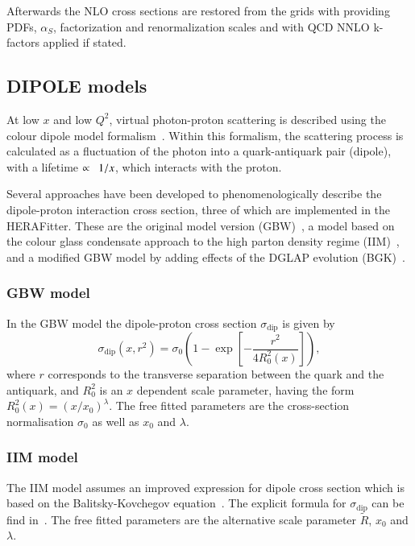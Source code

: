 \documentclass[11pt,a4paper]{article}
\begin{document}
Afterwards the NLO cross sections are restored from the grids
with providing PDFs, \(\alpha_S\), factorization and 
renormalization scales and with QCD NNLO k-factors applied
if stated.

\subsection{DIPOLE models}

At low $x$ and low $Q^{2}$, virtual photon-proton scattering is described using the colour
dipole model formalism~\cite{NNZ:91}. Within this formalism, the scattering process is calculated as a fluctuation of the
photon into a quark-antiquark pair (dipole), with a lifetime $\propto\enskip 1/x$, which interacts with the proton.

Several approaches have been developed to phenomenologically describe the dipole-proton interaction
cross section, three of which are implemented in the HERAFitter. These are
the original model version (GBW)~\cite{Golec-Biernat:1998js}, a model based on the colour glass condensate approach
to the high parton density regime (IIM)~\cite{Iancu:2003ge}, and a modified GBW model by adding effects of the 
DGLAP evolution (BGK)~\cite{Bartels:2002cj}.
\subsubsection{GBW model}
In the GBW model the dipole-proton cross section $\sigma_{\text{dip}}$ is given by
\begin{equation}
\label{eGBW}
   \sigma_{\text{dip}}(x,r^{2}) = \sigma_{0} \left(1 - \exp \left[-\frac{r^{2}}{4R_{0}^{2}(x)} \right]\right),
\end{equation}
where $r$ corresponds to the transverse separation between the quark and the antiquark, and $R_{0}^{2}$ is 
an $x$ dependent scale parameter, having the form $R_{0}^{2}(x)=\left(x/x_{0}\right)^{\lambda}$.
The free fitted parameters are the cross-section normalisation $\sigma_{0}$ as well as $x_{0}$ and $\lambda$.
\subsubsection{IIM model}
The IIM model assumes an improved expression for dipole cross section which is based on the 
Balitsky-Kovchegov equation~\cite{Balitsky:1995ub}. The explicit formula for $\sigma_{\text{dip}}$ 
can be find in~\cite{Iancu:2003ge}. The free fitted parameters are the alternative scale parameter $\tilde{R}$, $x_{0}$ and $\lambda$.
\end{document}
